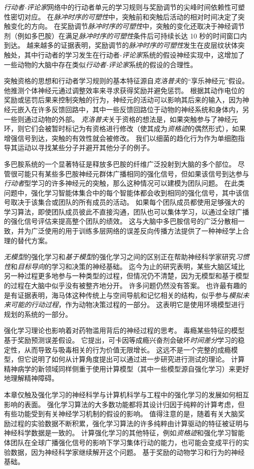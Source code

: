 \textit{行动者-评论家}网络中的行动者单元的学习规则与奖励调节的尖峰时间依赖性可塑性密切对应。
在\textit{脉冲时序的可塑性}中，突触前和突触后活动的相对时间决定了突触变化的方向。
在奖励调节\textit{脉冲时序的可塑性}中，突触的变化还取决于神经调节剂（例如多巴胺）在满足\textit{脉冲时序的可塑性}条件后可持续长达 10 秒的时间窗口内到达。
越来越多的证据表明，奖励调节的\textit{脉冲时序的可塑性}发生在皮层纹状体突触处，其中行动者的学习发生在行动者-\textit{评论家}系统的假设神经实现中，这增加了一些动物的大脑中存在类似\textit{行动者-评论家}系统的假设的合理性。


突触资格的思想和行动者学习规则的基本特征源自\textit{克洛普夫}的“享乐神经元”假设\cite{klopf1972brain,klopf1982hedonistic}。
他推测个体神经元通过调整效率来寻求获得奖励并避免惩罚。
根据其动作电位的奖励或惩罚后果来控制突触的行为，神经元的活动可以影响其后来的输入，因为神经元嵌入在许多反馈回路中，其中一些反馈回路位于动物的神经系统和身体内，另一些则通过动物的外部。
\textit{克洛普夫}关于资格的想法是，如果突触参与了神经元环，则它们会被暂时标记为有资格进行修改（使其成为\textit{资格迹}的偶然形式），如果增强信号到达，突触的有效性就会被修改。
我们以细菌的趋化行为作为单细胞指导其运动以寻找某些分子并避开其他分子的例子。


多巴胺系统的一个显著特征是释放多巴胺的纤维广泛投射到大脑的多个部位。
尽管很可能只有某些多巴胺神经元群体广播相同的强化信号，但如果该信号到达参与\textit{行动者}型学习的许多神经元的突触，那么这种情况可以建模为团队问题。
在此类问题中，强化学习智能体集合中的每个智能体都会收到相同的强化信号，其中该信号取决于该集合或团队的所有成员的活动。
如果每个团队成员都使用足够强大的学习算法，即使团队成员彼此不直接沟通，团队也可以集体学习，以通过全球广播的强化信号评估来提高整个团队的绩效。
这与大脑中多巴胺信号的广泛分散相一致，并为广泛使用的用于训练多层网络的误差反向传播方法提供了一种神经学上合理的替代方案。


\textit{无模型}的强化学习和\textit{基于模型}的强化学习之间的区别正在帮助神经科学家研究\textit{习惯性}和\textit{目标导向}的学习和决策的神经基础。
迄今为止的研究表明，某些大脑区域比另一种过程更多地参与一种类型的过程，但情况仍不清楚，因为无模型和基于模型的过程在大脑中似乎没有被整齐地分开。
许多问题仍然没有答案。
也许最有趣的是有证据表明，海马体这种传统上与空间导航和记忆相关的结构，似乎参与\textit{模拟未来可能的行动过程}，作为动物决策过程的一部分。
这表明它是使用环境模型进行规划的系统的一部分。


强化学习理论也影响着对药物滥用背后的神经过程的思考。
毒瘾某些特征的模型基于奖励预测误差假设。
它提出，可卡因等成瘾兴奋剂会破坏\textit{时间差分}学习的稳定性，从而导致与吸毒相关的行为价值无限增长。
这远不是一个完整的成瘾模型，但它说明了如何从计算角度提出可以通过进一步研究进行测试的理论。
计算精神病学的新领域同样侧重于使用计算模型（其中一些模型源自强化学习）来更好地理解精神障碍。



本章仅触及强化学习的神经科学与计算机科学与工程中的强化学习的发展如何相互影响的表面。
强化学习算法的大多数功能都将其设计归因于纯粹的计算考虑，但有些功能受到有关神经学习机制的假设的影响。
值得注意的是，随着有关大脑奖励过程的实验数据不断积累，强化学习算法的许多纯粹由计算驱动的特征被证明与神经科学数据是一致的。
计算强化学习的其他特征，例如\textit{资格迹}和强化学习智能体团队在全球广播强化信号的影响下学习集体行动的能力，也可能会变成平行的实验数据，因为神经科学家继续解开这个问题。
基于奖励的动物学习和行为的神经基础。








